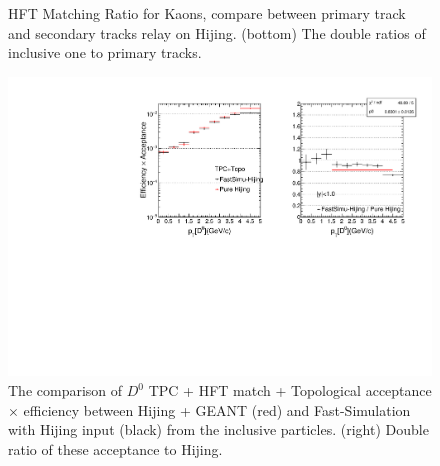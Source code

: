 \begin{figure}[htbp]
\begin{minipage}[htbp]{0.47\linewidth}
\caption{ HFT Matching Ratio for Kaons, compare between primary track and secondary tracks relay on Hijing.  (bottom) The double ratios of inclusive one to primary tracks.\label{HijingKaonsRatio}}
\end{minipage}
\end{figure}


\begin{figure}[htbp]
\centering
\includegraphics[keepaspectratio,width=1.0\textwidth,angle=0]{figure/Run14_D0HFT/Physics_FastHijingVsPureHijing_HFTTopo_inclusive.pdf}
\caption{The comparison of $D^0$ TPC + HFT match + Topological acceptance $\times$ efficiency between Hijing + GEANT (red) and Fast-Simulation with Hijing input (black) from the inclusive particles. (right) Double ratio of these acceptance to Hijing.}
\label{d0hfttoporealeffinclusive}
\end{figure}

